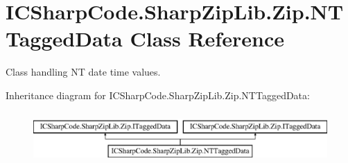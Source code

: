 \hypertarget{class_i_c_sharp_code_1_1_sharp_zip_lib_1_1_zip_1_1_n_t_tagged_data}{}\section{I\+C\+Sharp\+Code.\+Sharp\+Zip\+Lib.\+Zip.\+N\+T\+Tagged\+Data Class Reference}
\label{class_i_c_sharp_code_1_1_sharp_zip_lib_1_1_zip_1_1_n_t_tagged_data}


Class handling NT date time values.  


Inheritance diagram for I\+C\+Sharp\+Code.\+Sharp\+Zip\+Lib.\+Zip.\+N\+T\+Tagged\+Data\+:\begin{figure}[H]
\begin{center}
\leavevmode
\includegraphics[height=1.992882cm]{class_i_c_sharp_code_1_1_sharp_zip_lib_1_1_zip_1_1_n_t_tagged_data}
\end{center}
\end{figure}
